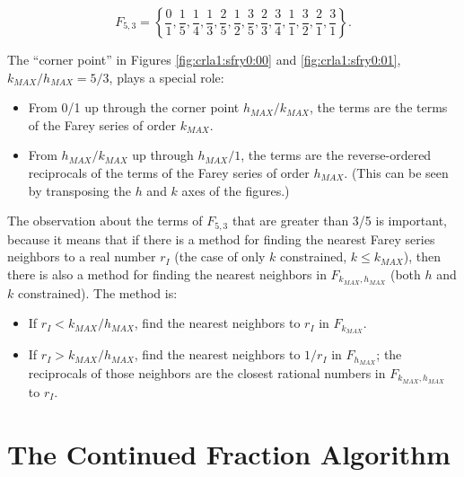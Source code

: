 \begin{equation}
\label{eq:crla1:sfry0:eq0002a}
F_{5,3}  = \left\{ {\frac{0}{1},\frac{1}{5},\frac{1}{4},
                    \frac{1}{3},\frac{2}{5},\frac{1}{2},
                    \frac{3}{5},\frac{2}{3},\frac{3}{4},
                    \frac{1}{1},\frac{3}{2},\frac{2}{1},
                    \frac{3}{1}} \right\} .
\end{equation}


The ``corner point'' in Figures \ref{fig:crla1:sfry0:00}
and \ref{fig:crla1:sfry0:01}, $k_{MAX}/h_{MAX} = 5/3$, plays a special role:

\begin{itemize}
\item From 0/1 up through the corner point $h_{MAX}/k_{MAX}$,
      the terms are the terms of the Farey series of order
      $k_{MAX}$.
\item From $h_{MAX}/k_{MAX}$ up through $h_{MAX}/1$, the terms
      are the reverse-ordered reciprocals of the terms of the
      Farey series of order $h_{MAX}$\@. (This can be seen
      by transposing the $h$ and $k$ axes of the figures.)
\end{itemize}

The observation about the terms of $F_{5,3}$ that are greater than 3/5 is
important, because it means that if there is a method for finding the
nearest Farey series neighbors to a real number $r_I$ (the case of
only $k$ constrained, $k \leq k_{MAX}$), then there is also a method for finding
the nearest neighbors in $F_{k_{MAX}, h_{MAX}}$ (both $h$ and $k$ constrained).
The method is:

\begin{itemize}
\item If $r_I < k_{MAX}/h_{MAX}$, find the nearest neighbors to $r_I$ in
      $F_{k_{MAX}}$.
\item If $r_I > k_{MAX}/h_{MAX}$, find the nearest neighbors to $1/r_I$
      in $F_{h_{MAX}}$; the reciprocals of those neighbors are the closest
      rational numbers in $F_{k_{MAX}, h_{MAX}}$ to $r_I$.
\end{itemize}

\section{The Continued Fraction Algorithm}
\label{crla1:scfr0}

